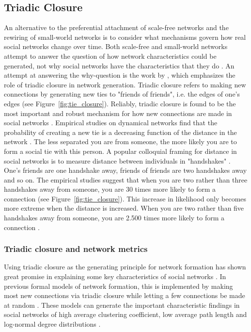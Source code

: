 \documentclass[11pt]{article}
\begin{document}
\subsection{Triadic Closure}
An alternative to the preferential attachment of scale-free networks and the rewiring of small-world networks is to consider what mechanisms govern how real social networks change over time. Both scale-free and small-world networks attempt to answer the question of how network characteristics could be generated, not why social networks have the characteristics that they do \cite{jacksonsearch2004}. An attempt at answering the why-question is the work by , which emphasizes the role of triadic closure in network generation. Triadic closure refers to making new connections by generating new ties to "friends of friends", i.e. the edges of one's edges (see Figure~\ref{fig:tie_closure}). Reliably, triadic closure is found to be the most important and robust mechanism for how new connections are made in social networks \cite{asikainen_cumulative_2020,bianconi_triadic_2014,kossinets_origins_2009,peixoto_disentangling_2022}. Empirical studies on dynamical networks find that the probability of creating a new tie is a decreasing function of the distance in the network \cite{bener_empirical_2016,kossinets_origins_2009}. The less separated you are from someone, the more likely you are to form a social tie with this person. A popular colloquial framing for distance in social networks is to measure distance between individuals in "handshakes" \cite{smith2005networks}. One's friends are one handshake away, friends of friends are two handshakes away and so on. The empirical studies suggest that when you are two rather than three handshakes away from someone, you are 30 times more likely to form a connection (see Figure~\ref{fig:tie_closure}). This increase in likelihood only becomes more extreme when the distance is increased. When you are two rather than five handshakes away from someone, you are 2.500 times more likely to form a connection \cite{kossinets_origins_2009}. 

\subsubsection{Triadic closure and network metrics}
Using triadic closure as the generating principle for network formation has shown great promise in explaining some key characteristics of social networks \cite{ilany_social_2016}. In previous formal models of network formation, this is implemented by making most new connections via triadic closure while letting a few connections be made at random \cite{ilany_social_2016,jacksonsearch2004,jacksonmeeting2007}. These models can generate the important characteristic findings in social networks of high average clustering coefficient, low average path length and log-normal degree distributions \cite{jacksonsearch2004,jacksonmeeting2007}. 
\end{document}
